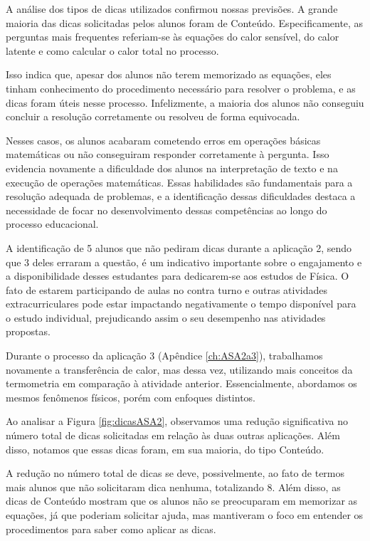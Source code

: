 A análise dos tipos de dicas utilizados confirmou nossas previsões. A grande maioria das dicas solicitadas pelos alunos foram de Conteúdo. Especificamente, as perguntas mais frequentes referiam-se às equações do calor sensível, do calor latente e como calcular o calor total no processo.

Isso indica que, apesar dos alunos não terem memorizado as equações, eles tinham conhecimento do procedimento necessário para resolver o problema, e as dicas foram úteis nesse processo. Infelizmente, a maioria dos alunos não conseguiu concluir a resolução corretamente ou resolveu de forma equivocada.

Nesses casos, os alunos acabaram cometendo erros em operações básicas matemáticas ou não conseguiram responder corretamente à pergunta. Isso evidencia novamente a dificuldade dos alunos na interpretação de texto e na execução de operações matemáticas. Essas habilidades são fundamentais para a resolução adequada de problemas, e a identificação dessas dificuldades destaca a necessidade de focar no desenvolvimento dessas competências ao longo do processo educacional.

A identificação de 5 alunos que não pediram dicas durante a aplicação 2, sendo que 3 deles erraram a questão, é um indicativo importante sobre o engajamento e a disponibilidade desses estudantes para dedicarem-se aos estudos de Física. O fato de estarem participando de aulas no contra turno e outras atividades extracurriculares pode estar impactando negativamente o tempo disponível para o estudo individual, prejudicando assim o seu desempenho nas atividades propostas.

Durante o processo da aplicação 3 (Apêndice \ref{ch:ASA2a3}), trabalhamos novamente a transferência de calor, mas dessa vez, utilizando mais conceitos da termometria em comparação à atividade anterior. Essencialmente, abordamos os mesmos fenômenos físicos, porém com enfoques distintos.

Ao analisar a Figura \ref{fig:dicasASA2}, observamos uma redução significativa no número total de dicas solicitadas em relação às duas outras aplicações. Além disso, notamos que essas dicas foram, em sua maioria, do tipo Conteúdo.

A redução no número total de dicas se deve, possivelmente, ao fato de termos mais alunos que não solicitaram dica nenhuma, totalizando 8. Além disso, as dicas de Conteúdo mostram que os alunos não se preocuparam em memorizar as equações, já que poderiam solicitar ajuda, mas mantiveram o foco em entender os procedimentos para saber como aplicar as dicas.

